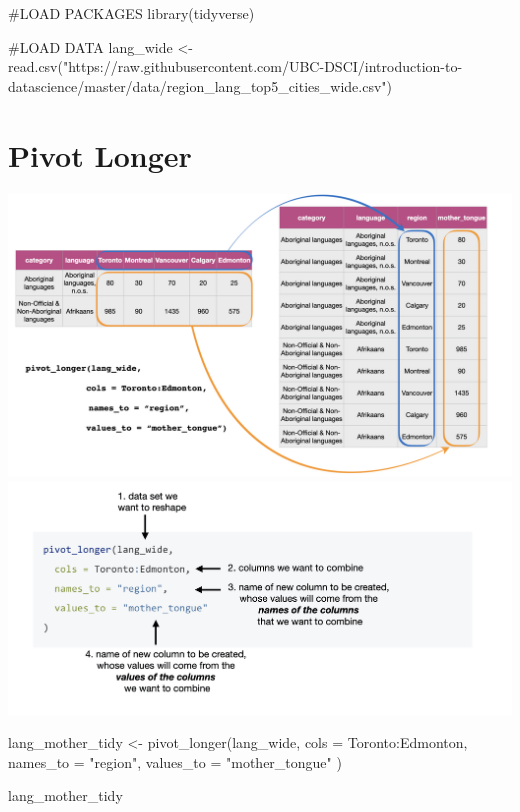 \documentclass[
  letterpaper,
  DIV=11,
  numbers=noendperiod]{scrartcl}
\newenvironment{Shaded}{\begin{snugshade}}{\end{snugshade}}
\newcommand{\AttributeTok}[1]{\textcolor[rgb]{0.40,0.45,0.13}{#1}}
\newcommand{\CommentTok}[1]{\textcolor[rgb]{0.37,0.37,0.37}{#1}}
\newcommand{\FunctionTok}[1]{\textcolor[rgb]{0.28,0.35,0.67}{#1}}
\newcommand{\NormalTok}[1]{\textcolor[rgb]{0.00,0.23,0.31}{#1}}
\newcommand{\OtherTok}[1]{\textcolor[rgb]{0.00,0.23,0.31}{#1}}
\newcommand{\SpecialCharTok}[1]{\textcolor[rgb]{0.37,0.37,0.37}{#1}}
\newcommand{\StringTok}[1]{\textcolor[rgb]{0.13,0.47,0.30}{#1}}
\begin{document}
\begin{Shaded}
\begin{Highlighting}[]
\CommentTok{\#LOAD PACKAGES}
\FunctionTok{library}\NormalTok{(tidyverse)}

\CommentTok{\#LOAD DATA}
\NormalTok{lang\_wide }\OtherTok{\textless{}{-}} \FunctionTok{read.csv}\NormalTok{(}\StringTok{"https://raw.githubusercontent.com/UBC{-}DSCI/introduction{-}to{-}datascience/master/data/region\_lang\_top5\_cities\_wide.csv"}\NormalTok{)}
\end{Highlighting}
\end{Shaded}

\hypertarget{pivot-longer}{%
\section{Pivot Longer}\label{pivot-longer}}

\includegraphics{118_J_pivoting_Notes_files/mediabag/pivot_functions.003.jpg}
\includegraphics{118_J_pivoting_Notes_files/mediabag/pivot_longer.jpg}

\begin{Shaded}
\begin{Highlighting}[]
\NormalTok{lang\_mother\_tidy }\OtherTok{\textless{}{-}} \FunctionTok{pivot\_longer}\NormalTok{(lang\_wide,}
  \AttributeTok{cols =}\NormalTok{ Toronto}\SpecialCharTok{:}\NormalTok{Edmonton,}
  \AttributeTok{names\_to =} \StringTok{"region"}\NormalTok{,}
  \AttributeTok{values\_to =} \StringTok{"mother\_tongue"}
\NormalTok{)}

\NormalTok{lang\_mother\_tidy}
\end{Highlighting}
\end{Shaded}
\end{document}
